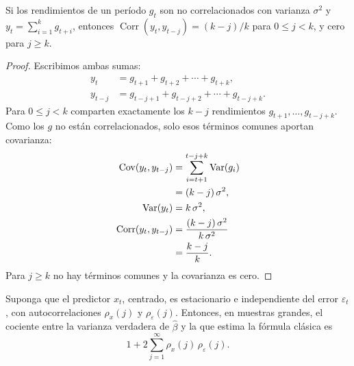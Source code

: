 \begin{proposicion}\label{prop:traslape}
Si los rendimientos de un período $g_t$ son no correlacionados con varianza $\sigma^2$ y
$y_t=\sum_{i=1}^kg_{t+i}$, entonces $\operatorname{Corr}(y_t,y_{t-j})=(k-j)/k$ para $0\le j<k$, y cero para
$j\ge k$.
\end{proposicion}

\begin{proof}
Escribimos ambas sumas:
\begin{align*}
  y_t     &= g_{t+1}+g_{t+2}+\cdots+g_{t+k},\\
  y_{t-j} &= g_{t-j+1}+g_{t-j+2}+\cdots+g_{t-j+k}.
\end{align*}
Para $0\le j<k$ comparten exactamente los $k-j$ rendimientos $g_{t+1},\dots,g_{t-j+k}$. Como los $g$ no
están correlacionados, solo esos términos comunes aportan covarianza:
\begin{align*}
  \operatorname{Cov}(y_t,y_{t-j})            &= \sum_{i=t+1}^{t-j+k}\operatorname{Var}(g_i)\\
                               &= (k-j)\,\sigma^2,\\
  \operatorname{Var}(y_t)                    &= k\,\sigma^2,\\
  \operatorname{Corr}(y_t,y_{t-j}) &= \frac{(k-j)\,\sigma^2}{k\,\sigma^2}\\
                               &= \frac{k-j}{k}.
\end{align*}
Para $j\ge k$ no hay términos comunes y la covarianza es cero.
\end{proof}

\begin{proposicion}\label{prop:inflacion}
Suponga que el predictor $x_t$, centrado, es estacionario e independiente del error $\varepsilon_t$, con
autocorrelaciones $\rho_x(j)$ y $\rho_\varepsilon(j)$. Entonces, en muestras grandes, el cociente entre la
varianza verdadera de $\hat\beta$ y la que estima la fórmula clásica es
\[
  1+2\sum_{j=1}^{\infty}\rho_x(j)\,\rho_\varepsilon(j).
\]
\end{proposicion}

